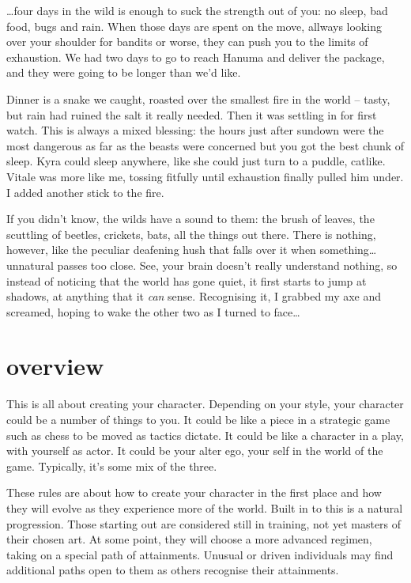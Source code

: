 \onecolumn
{\LARGE
\ldots four days in the wild is enough to suck the strength out of you: no
sleep, bad food, bugs and rain. When those days are spent on the move,
allways looking over your shoulder for bandits or worse, they
can push you to the limits of exhaustion. We had two days to go
to reach Hanuma and deliver the package, and they were going to
be longer than we'd like.

Dinner is a snake we caught, roasted over the smallest fire in
the world  -- tasty, but rain had ruined the salt it really needed.
Then it was settling in for first watch. This is always a mixed
blessing: the hours just after sundown were the most dangerous
as far as the beasts were concerned but you got the best chunk
of sleep. Kyra could sleep anywhere, like she could just turn to
a puddle, catlike. Vitale was more like me, tossing fitfully
until exhaustion finally pulled him under. I added another stick
to the fire.

If you didn't know, the wilds have a sound to them: the brush of leaves, the
scuttling of beetles, crickets, bats, all the things out there.
There is nothing, however, like the peculiar deafening hush that falls
over it when something\ldots unnatural passes too close. See, your
brain doesn't really understand nothing, so instead of noticing
that the world has gone quiet, it first starts to jump at shadows, at
anything that it \emph{can} sense. Recognising it, I grabbed my axe and
screamed, hoping to wake the other two as I turned to face\ldots}
\twocolumn
\chapter{overview}
This is all about creating your character. Depending on your
style, your character could be a number of things to you. It
could be like a piece in a strategic game such as chess to be
moved as tactics dictate. It could be like a character in a
play, with yourself as actor. It could be your alter ego, your
self in the world of the game. Typically, it's some mix of the
three.

These rules are about how to create your character in the first place
and how they will evolve as they experience more of the world.
Built in to this is a natural progression. Those starting out
are considered still in training, not yet masters of their
chosen art. At some point, they will choose a more advanced
regimen, taking on a special path of attainments. Unusual or
driven individuals may find additional paths open to them as others
recognise their attainments.
